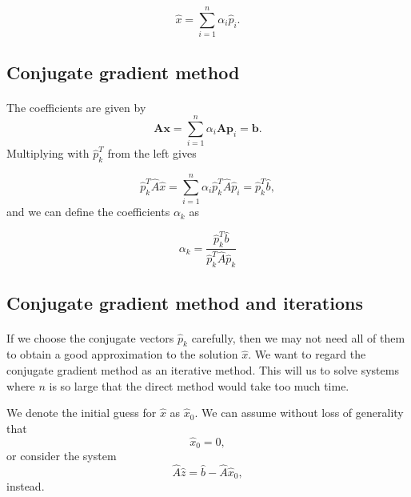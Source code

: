 \documentclass[%
twoside,                 %
final,                   %
10pt]{article}
\begin{document}
\begin{equation*}
  \hat{x}  = \sum^{n}_{i=1} \alpha_i \hat{p}_i.
\end{equation*}



\subsection*{Conjugate gradient method}

\paragraph{}
The coefficients are given by
\begin{equation*}
    \mathbf{A}\mathbf{x} = \sum^{n}_{i=1} \alpha_i \mathbf{A} \mathbf{p}_i = \mathbf{b}.
\end{equation*}
Multiplying with $\hat{p}_k^T$  from the left gives

\begin{equation*}
  \hat{p}_k^T \hat{A}\hat{x} = \sum^{n}_{i=1} \alpha_i\hat{p}_k^T \hat{A}\hat{p}_i= \hat{p}_k^T \hat{b},
\end{equation*}
and we can define the coefficients $\alpha_k$ as

\begin{equation*}
    \alpha_k = \frac{\hat{p}_k^T \hat{b}}{\hat{p}_k^T \hat{A} \hat{p}_k}
\end{equation*}



\subsection*{Conjugate gradient method and iterations}

\paragraph{}

If we choose the conjugate vectors $\hat{p}_k$ carefully, 
then we may not need all of them to obtain a good approximation to the solution 
$\hat{x}$. 
We want to regard the conjugate gradient method as an iterative method. 
This will us to solve systems where $n$ is so large that the direct 
method would take too much time.

We denote the initial guess for $\hat{x}$ as $\hat{x}_0$. 
We can assume without loss of generality that
\begin{equation*}
\hat{x}_0=0,
\end{equation*}
or consider the system
\begin{equation*}
\hat{A}\hat{z} = \hat{b}-\hat{A}\hat{x}_0,
\end{equation*}
instead.
\end{document}
